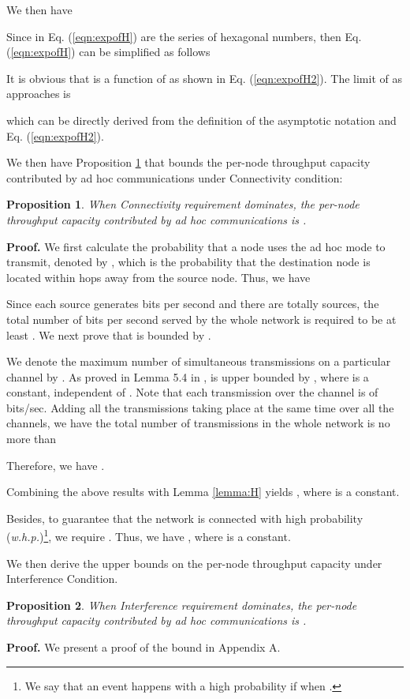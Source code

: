 \documentclass[10pt,journal]{IEEEtran}
\newtheorem{proposition}{Proposition}
\def\done{\hspace*{\fill} }
\begin{document}
We then have


Since  in Eq. (\ref{eqn:expofH}) are the series of hexagonal numbers, then Eq. (\ref{eqn:expofH}) can be simplified as follows 


It is obvious that  is a function of  as shown in Eq. (\ref{eqn:expofH2}). The limit of  as  approaches  is 

which can be directly derived from the definition of the asymptotic notation  and Eq. (\ref{eqn:expofH2}).
\done

We then have Proposition \ref{prop:regime-i} that bounds the per-node throughput capacity contributed by ad hoc communications under Connectivity condition:

\begin{proposition}
\label{prop:regime-i}
When Connectivity requirement dominates, the per-node throughput capacity contributed by ad hoc communications is .
\end{proposition}
\textbf{Proof.} We first calculate the probability that a node uses the ad hoc mode to transmit, denoted by , which is the probability that the destination node is located within  hops away from the source node. Thus, we have 


Since each source generates  bits per second and there are totally  sources, the total number of bits per second served by the whole network is required to be at least . We next prove that  is bounded by .

We denote the maximum number of simultaneous transmissions on a particular channel by . As proved in Lemma 5.4 in \cite{Gupta:Kumar},  is upper bounded by , where  is a constant, independent of . Note that each transmission over the  channel is of  bits/sec. Adding all the transmissions taking place at the same time over all the  channels, we have the total number of transmissions in the whole network is no more than 

Therefore, we have .

Combining the above results with Lemma \ref{lemma:H} yields , where  is a constant. 

Besides, to guarantee that the network is connected with high probability (\textit{w.h.p.})\footnote{We say that an event  happens with a high probability if  when .}, we require  \cite{Gupta:Kumar}. Thus, we have , where  is a constant.
\done

We then derive the upper bounds on the per-node throughput capacity under Interference Condition.

\begin{proposition}
\label{prop:regime-ii}
When Interference requirement dominates, the per-node throughput capacity contributed by ad hoc communications is .
\end{proposition}
\textbf{Proof.} 
We present a proof of the bound in Appendix A. \done
\end{document}
